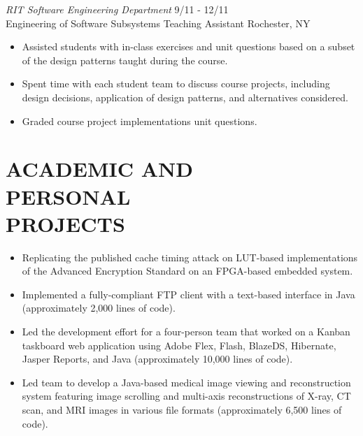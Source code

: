 \documentclass[line,margin]{res}
\begin{document}
\begin{resume}
	{\sl RIT Software Engineering Department} \hfill    9/11 - 12/11\\
	Engineering of Software Subsystems Teaching Assistant \hfill Rochester, NY
	\begin{itemize} \itemsep -2pt %
	\item Assisted students with in-class exercises and unit questions based on a subset of the design patterns taught during the course.
	\item Spent time with each student team to discuss course projects, including design decisions, application of design patterns, and alternatives considered.
	\item Graded course project implementations unit questions.
	\end{itemize}

\section{ACADEMIC AND \\ PERSONAL \\PROJECTS}             
	\begin{itemize}
	\item Replicating the published cache timing attack on LUT-based implementations of the Advanced Encryption Standard on an FPGA-based embedded system.
	\item Implemented a fully-compliant FTP client with a text-based interface in Java (approximately 2,000 lines of code). 
	\item Led the development effort for a four-person team that worked on a Kanban taskboard web application using Adobe Flex, Flash, BlazeDS, Hibernate, Jasper Reports, and Java (approximately 10,000 lines of code).
	\item Led team to develop a Java-based medical image viewing and reconstruction system featuring image scrolling and multi-axis reconstructions of X-ray, CT scan, and MRI images in various file formats (approximately 6,500 lines of code).
	\end{itemize}


\end{resume}
\end{document}

